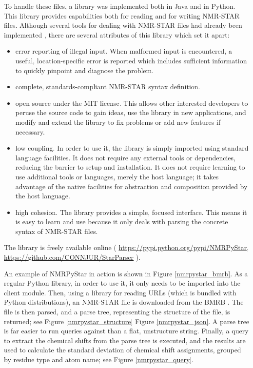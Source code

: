 To handle these files, a library was implemented both in Java 
\cite{fenwick2013} and in Python.  This library provides capabilities both
for reading and for writing NMR-STAR files.  Although several tools for
dealing with NMR-STAR files had already been implemented \cite{ccpn, bmrb},
there are several attributes of this library which set it apart:
\begin{itemize}
  \item error reporting of illegal input.  When malformed input is encountered,
    a useful, location-specific error is reported which includes sufficient
    information to quickly pinpoint and diagnose the problem.
  \item complete, standards-compliant NMR-STAR syntax definition.
  \item open source under the MIT license.  This allows other interested 
    developers to peruse the source code to gain ideas, use the library in
    new applications, and modify and extend the library to fix problems or
    add new features if necessary.
  \item low coupling.  In order to use it, the library is simply imported 
    using standard language facilities.  It does not require any external tools
    or dependencies, reducing the barrier to setup and installation.  It does
    not require learning to use additional tools or languages, merely the 
    host language; it takes advantage of the native facilities for abstraction
    and composition provided by the host language.
  \item high cohesion.  The library provides a simple, focused interface.
    This means it is easy to learn and use because it only deals with parsing
    the concrete syntax of NMR-STAR files.
\end{itemize}
The library is freely available online (
\url{https://pypi.python.org/pypi/NMRPyStar}, 
\url{https://github.com/CONNJUR/StarParser}
).

An example of NMRPyStar in action is shown in Figure \ref{nmrpystar_bmrb}.
As a regular Python library, in order to use it, it only needs to be 
imported into the client module.  Then, using a library for reading URLs
(which is bundled with Python distributions), an NMR-STAR file is downloaded
from the BMRB \cite{bmrb}.  The file is then parsed, and a parse tree, 
representing the structure of the file, is returned; see 
Figure \ref{nmrpystar_structure} Figure \ref{nmrpystar_json}.  
A parse tree is far easier to run queries against than a flat,
unstructure string.  Finally, a query to extract the chemical shifts
from the parse tree is executed, and the results are used to calculate the
standard deviation of chemical shift assignments, grouped by residue type
and atom name; see Figure \ref{nmrpystar_query}.

